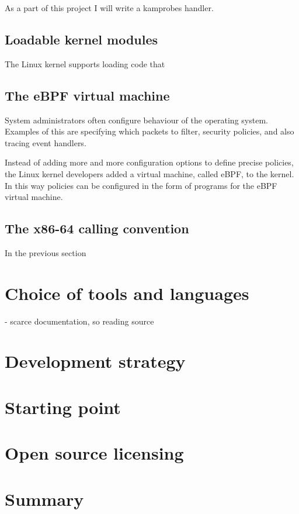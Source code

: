         As a part of this project I will write a kamprobes handler.  


    \subsection{Loadable kernel modules}
        The Linux kernel supports loading code that   

    \subsection{The eBPF virtual machine}
        System administrators often configure behaviour of the operating system. Examples of this are specifying which packets to filter, security policies, and also tracing event handlers. 

        Instead of adding more and more configuration options to define precise policies, the Linux kernel developers added a virtual machine, called eBPF, to the kernel. In this way policies can be configured in the form of programs for the eBPF virtual machine.

    \subsection{The x86-64 calling convention}
        In the previous section


\section{Choice of tools and languages}

    - scarce documentation, so reading source

\section{Development strategy}

\section{Starting point}

\section{Open source licensing}

\section{Summary}
